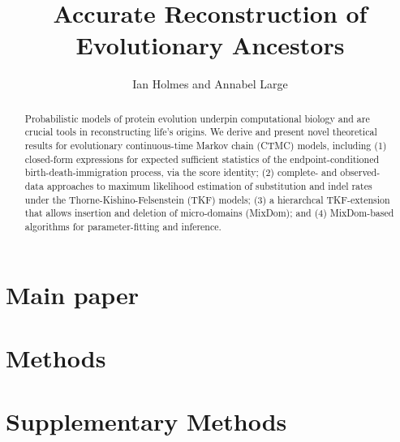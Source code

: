 \documentclass{article}
\title{Accurate Reconstruction of Evolutionary Ancestors}
\author{Ian Holmes and Annabel Large}
\begin{document}
\maketitle

\begin{abstract}
Probabilistic models of protein evolution underpin computational biology and are crucial tools in reconstructing life's origins.
We derive and present novel theoretical results for evolutionary continuous-time Markov chain (CTMC) models, including
(1) closed-form expressions for expected sufficient statistics of the endpoint-conditioned birth-death-immigration process, via the score identity;
(2) complete- and observed-data approaches to maximum likelihood estimation of substitution and indel rates under the
Thorne-Kishino-Felsenstein (TKF) models;
(3) a hierarchcal TKF-extension that allows insertion and deletion of micro-domains (MixDom); and
(4) MixDom-based algorithms for parameter-fitting and inference.
\end{abstract}

\tableofcontents

\part{Main paper}



\part{Methods}













\part{Supplementary Methods}

\appendix










\end{document}
